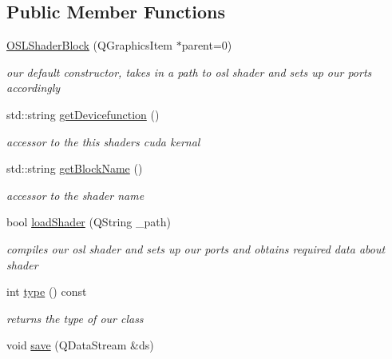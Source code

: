 \subsection*{Public Member Functions}
\begin{DoxyCompactItemize}
\item 
\hyperlink{class_o_s_l_shader_block_a265e920913d83ef46f5d9a7075687a7b}{O\-S\-L\-Shader\-Block} (Q\-Graphics\-Item $\ast$parent=0)
\begin{DoxyCompactList}\small\item\em our default constructor, takes in a path to osl shader and sets up our ports accordingly \end{DoxyCompactList}\item 
std\-::string \hyperlink{class_o_s_l_shader_block_aec2dc7eb77840b0270c2f4112133b3f7}{get\-Devicefunction} ()
\begin{DoxyCompactList}\small\item\em accessor to the this shaders cuda kernal \end{DoxyCompactList}\item 
std\-::string \hyperlink{class_o_s_l_shader_block_a1af4f62c3a39d6eed25123695bcbceee}{get\-Block\-Name} ()
\begin{DoxyCompactList}\small\item\em accessor to the shader name \end{DoxyCompactList}\item 
bool \hyperlink{class_o_s_l_shader_block_a4c5f75777bcd1a81bd66294f3d736214}{load\-Shader} (Q\-String \-\_\-path)
\begin{DoxyCompactList}\small\item\em compiles our osl shader and sets up our ports and obtains required data about shader \end{DoxyCompactList}\item 
\hypertarget{class_o_s_l_shader_block_acafc30832b9fa520cf0294451dfd2301}{int \hyperlink{class_o_s_l_shader_block_acafc30832b9fa520cf0294451dfd2301}{type} () const }\label{class_o_s_l_shader_block_acafc30832b9fa520cf0294451dfd2301}

\begin{DoxyCompactList}\small\item\em returns the type of our class \end{DoxyCompactList}\item 
\hypertarget{class_o_s_l_shader_block_a9154c7cae58c25d43de7302cf1c836a4}{void \hyperlink{class_o_s_l_shader_block_a9154c7cae58c25d43de7302cf1c836a4}{save} (Q\-Data\-Stream \&ds)}\label{class_o_s_l_shader_block_a9154c7cae58c25d43de7302cf1c836a4}


\end{DoxyCompactItemize}
